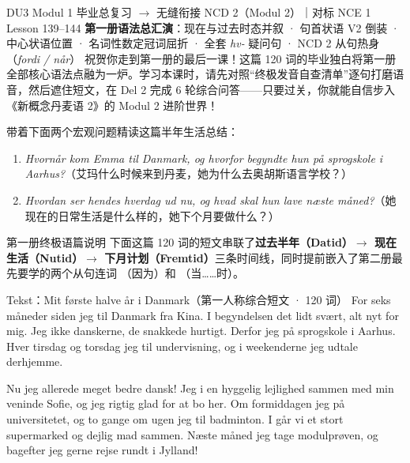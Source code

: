 {DU3 Modul 1 毕业总复习 $\rightarrow$ 无缝衔接 NCD 2（Modul 2）｜对标 NCE 1 Lesson 139--144}
{\textbf{第一册语法总汇演}：现在与过去时态并叙 · 句首状语 V2 倒装 · 中心状语位置 · 名词性数定冠词屈折 · 全套 \textit{hv-} 疑问句 · NCD 2 从句热身（\textit{fordi / når}）}
{祝贺你走到第一册的最后一课！这篇 120 词的毕业独白将第一册全部核心语法点融为一炉。学习本课时，请先对照“终极发音自查清单”逐句打磨语音，然后遮住短文，在 Del 2 完成 6 轮综合问答——只要过关，你就能自信步入《新概念丹麦语 2》的 Modul 2 进阶世界！}

\begin{foerduleaeser}
带着下面两个宏观问题精读这篇半年生活总结：
\begin{enumerate}
  \item \textit{Hvornår kom Emma til Danmark, og hvorfor begyndte hun på sprogskole i Aarhus?}（艾玛什么时候来到丹麦，她为什么去奥胡斯语言学校？）
  \item \textit{Hvordan ser hendes hverdag ud nu, og hvad skal hun lave næste måned?}（她现在的日常生活是什么样的，她下个月要做什么？）
\end{enumerate}
\end{foerduleaeser}


\begin{tipbox}{第一册终极语篇说明}
下面这篇 120 词的短文串联了\textbf{过去半年（Datid）$\rightarrow$ 现在生活（Nutid）$\rightarrow$ 下月计划（Fremtid）}三条时间线，同时提前嵌入了第二册最先要学的两个从句连词 （因为）和 （当……时）。
\end{tipbox}

\begin{emailbox}{Tekst：Mit første halve år i Danmark（第一人称综合短文 · 120 词）}
For seks måneder siden  jeg til Danmark fra Kina. I begyndelsen  det lidt svært,  alt  nyt for mig. Jeg  ikke danskerne,  de snakkede hurtigt. Derfor  jeg på sprogskole i Aarhus. Hver tirsdag og torsdag  jeg til undervisning, og i weekenderne  jeg udtale derhjemme.

Nu  jeg allerede meget bedre dansk! Jeg  i en hyggelig lejlighed sammen med min veninde Sofie, og jeg  rigtig glad for at bo her. Om formiddagen  jeg på universitetet, og to gange om ugen  jeg til badminton. I går  vi et stort supermarked og  dejlig mad sammen. Næste måned  jeg tage modulprøven, og bagefter  jeg gerne rejse rundt i Jylland!
\end{emailbox}

